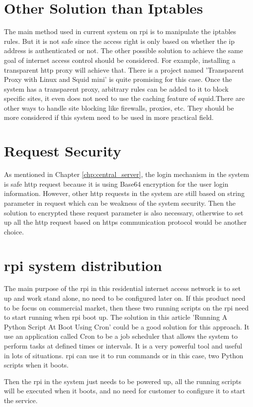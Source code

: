\section{Other Solution than Iptables}
\par The main method used in current system on \gls{rpi} is to manipulate the iptables rules. But it is not safe since the access right is only based on whether the \gls{ip} address is authenticated or not. The other possible solution to achieve the same goal of internet access control should be considered. For example, installing a transparent \gls{http} proxy will achieve that. There is a project named 'Transparent Proxy with Linux and Squid mini'\cite{transparentproxy} is quite promising for this case. Once the system has a transparent proxy, arbitrary rules can be added to it to block specific sites, it even does not need to use the caching feature of squid.There are other ways to handle site blocking like firewalls, proxies, etc. They should be more considered if this system need to be used in more practical field.

\section{Request Security}
\par As mentioned in Chapter \ref{chp:central_server}, the login mechanism in the system is safe \gls{http} request because it is using Base64 encryption for the user login information. However, other \gls{http} requests in the system are still based on string parameter in request which can be weakness of the system security. Then the solution to encrypted these request parameter is also necessary, otherwise to set up all the \gls{http} request based on \gls{https} communication protocol would be another choice.

\section{\gls{rpi} system distribution}
\par The main purpose of the \gls{rpi} in this residential internet access network is to set up and work stand alone, no need to be configured later on. If this product need to be focus on commercial market, then these two running scripts on the \gls{rpi} need to start running when \gls{rpi} boot up. The solution in this article 'Running A Python Script At Boot Using Cron'\cite{runatboot} could be a good solution for this approach. It use an application called Cron to be a job scheduler that allows the system to perform tasks at defined times or intervals. It is a very powerful tool and useful in lots of situations. \gls{rpi} can use it to run commands or in this case, two Python scripts when it boots.
\par Then the \gls{rpi} in the system just needs to be powered up, all the running scripts will be executed when it boots, and no need for customer to configure it to start the service.